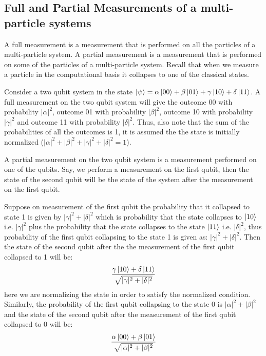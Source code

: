 \subsection{Full and Partial Measurements of a multi-particle systems}
A full measurement is a measurement that is performed on all the particles of a multi-particle system.
A partial measurement is a measurement that is performed on some of the particles of a multi-particle system.
Recall that when we measure a particle in the computational basis it collapses to one of the classical states.
\begin{example}
    Consider a two qubit system in the state $\ket{\psi}=\alpha\ket{00}+\beta\ket{01}+\gamma\ket{10}+\delta\ket{11}$.
    A full measurement on the two qubit system will give the outcome 00 with probability $|\alpha|^2$, outcome 01 with probability $|\beta|^2$, outcome 10 with probability $|\gamma|^2$ and outcome 11 with probability $|\delta|^2$. Thus, also note that 
    the sum of the probabilities of all the outcomes is 1, it is assumed the the state is initially normalized ($|\alpha|^2+|\beta|^2+|\gamma|^2+|\delta|^2=1$).
    
    A partial measurement on the two qubit system is a measurement performed on one of the qubits. Say, we perform a measurement on the first qubit, then the state of the second qubit will be the state of the system after the measurement on the first qubit.
    
    Suppose on measurement of the first qubit the probability that it collapsed to state 1 is given by $|\gamma|^2+|\delta|^2$ which is probability that the state collapses to $\ket{10}$ i.e. $|\gamma|^2$ plus the probability that the state collapses to the state
    $\ket{11}$ i.e. $|\delta|^2$, thus probability of the first qubit collapsing to the state 1 is given as: $|\gamma|^2 + |\delta|^2$. Then the state of the second qubit after the the measurement of the first qubit collapsed to 1 will be:
    \[
        \dfrac{\gamma\ket{10}+\delta\ket{11}}{\sqrt{|\gamma|^2+|\delta|^2}}
    \]
    here we are normalizing the state in order to satisfy the normalized condition.
    Similarly, the probability of the first qubit collapsing to the state 0 is $|\alpha|^2+|\beta|^2$ and the state of the second qubit after the measurement of the first qubit collapsed to 0 will be:
    \[
        \dfrac{\alpha\ket{00}+\beta\ket{01}}{\sqrt{|\alpha|^2+|\beta|^2}}
    \]
\end{example}

